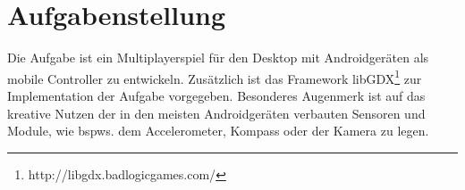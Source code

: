 \section{Aufgabenstellung}
Die Aufgabe ist ein Multiplayerspiel für den Desktop mit Androidgeräten als mobile Controller zu entwickeln. 
Zusätzlich ist das Framework libGDX\footnote{http://libgdx.badlogicgames.com/} zur Implementation der Aufgabe vorgegeben. 
Besonderes Augenmerk ist auf das kreative Nutzen der in den meisten Androidgeräten verbauten Sensoren und Module, wie bspws. dem Accelerometer, Kompass oder der Kamera zu legen.
